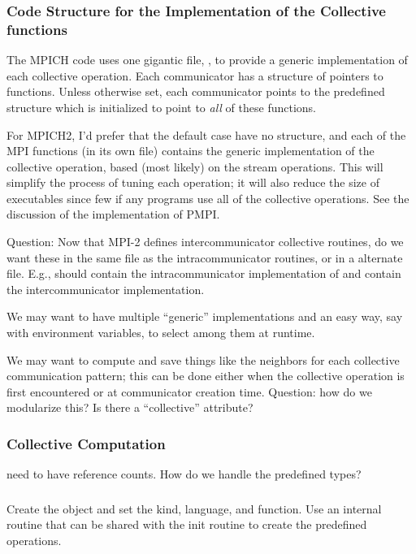 \documentclass{article}
\begin{document}
\subsubsection{Code Structure for the Implementation of the Collective
  functions} 

The MPICH code uses one gigantic file, , to provide a
generic implementation of each collective operation.  Each
communicator has a structure of pointers to functions.  Unless
otherwise set, each communicator points to the predefined structure
 which is
initialized to point to \emph{all} of 
these functions.  

For MPICH2, I'd prefer that the default case have no structure, and
each of the MPI functions (in its own file) contains the generic
implementation of the collective operation, based (most likely) on the
stream operations.  This will simplify the process of tuning each
operation; it will also reduce the size of executables since few if
any programs use all of the collective operations.
See the discussion of the implementation of PMPI.

Question: Now that MPI-2 defines intercommunicator collective
routines, do we want these in the same file as the intracommunicator
routines, or in a alternate file.  E.g., should  contain
the intracommunicator implementation of  and
 contain the intercommunicator implementation.

We may want to have multiple ``generic'' implementations and an easy
way, say with environment variables, to select among them at runtime.

We may want to compute and save things like the neighbors for each
collective communication pattern; this can be done either when the
collective operation is first encountered or at communicator creation
time.  Question: how do we modularize this?  Is there a ``collective''
attribute?

\subsubsection{Collective Computation}
 need to have reference counts.  How do we handle the
predefined types?  

\subsubsection{}
Create the object and set the kind, language, and function.  Use an
internal routine that can be shared with the init routine to create
the predefined operations.
\end{document}
